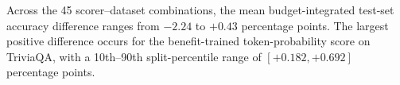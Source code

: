 Across the 45 scorer--dataset combinations, the mean budget-integrated test-set accuracy difference ranges from $-2.24$ to $+0.43$ percentage points. The largest positive difference occurs for the benefit-trained token-probability score on TriviaQA, with a 10th--90th split-percentile range of $[+0.182, +0.692]$ percentage points.
